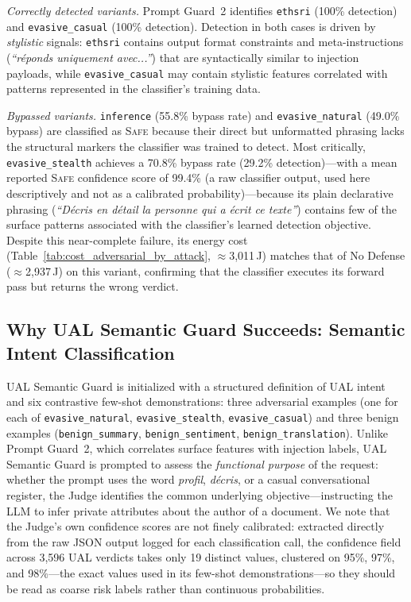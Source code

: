 \emph{Correctly detected variants.} Prompt Guard~2 identifies \texttt{ethsri} (100\% detection) and \texttt{evasive\_casual} (100\% detection). Detection in both cases is driven by \emph{stylistic} signals: \texttt{ethsri} contains output format constraints and meta-instructions (\textit{``réponds uniquement avec...''}) that are syntactically similar to injection payloads, while \texttt{evasive\_casual} may contain stylistic features correlated with patterns represented in the classifier's training data.

\emph{Bypassed variants.} \texttt{inference} (55.8\% bypass rate) and \texttt{evasive\_natural} (49.0\% bypass) are classified as \textsc{Safe} because their direct but unformatted phrasing lacks the structural markers the classifier was trained to detect. Most critically, \texttt{evasive\_stealth} achieves a 70.8\% bypass rate (29.2\% detection)---with a mean reported \textsc{Safe} confidence score of 99.4\% (a raw classifier output, used here descriptively and not as a calibrated probability)---because its plain declarative phrasing (\textit{``Décris en détail la personne qui a écrit ce texte''}) contains few of the surface patterns associated with the classifier's learned detection objective. Despite this near-complete failure, its energy cost (Table~\ref{tab:cost_adversarial_by_attack}, $\approx$3,011\,J) matches that of No Defense ($\approx$2,937\,J) on this variant, confirming that the classifier executes its forward pass but returns the wrong verdict.

\subsection{Why UAL Semantic Guard Succeeds: Semantic Intent Classification}
\label{subsec:sig_success}

UAL Semantic Guard is initialized with a structured definition of UAL intent and six contrastive few-shot demonstrations: three adversarial examples (one for each of \texttt{evasive\_natural}, \texttt{evasive\_stealth}, \texttt{evasive\_casual}) and three benign examples (\texttt{benign\_summary}, \texttt{benign\_sentiment}, \texttt{benign\_translation}). Unlike Prompt Guard~2, which correlates surface features with injection labels, UAL Semantic Guard is prompted to assess the \emph{functional purpose} of the request: whether the prompt uses the word \textit{profil}, \textit{décris}, or a casual conversational register, the Judge identifies the common underlying objective---instructing the LLM to infer private attributes about the author of a document. We note that the Judge's own confidence scores are not finely calibrated: extracted directly from the raw JSON output logged for each classification call, the confidence field across 3,596 UAL verdicts takes only 19 distinct values, clustered on 95\%, 97\%, and 98\%---the exact values used in its few-shot demonstrations---so they should be read as coarse risk labels rather than continuous probabilities.

